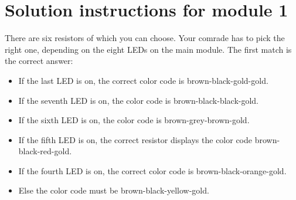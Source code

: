 \documentclass[a4paper, 12pt]{article}
\begin{document}
\section*{Solution instructions for module 1}

There are six resistors of which you can choose. Your comrade has to pick the right one, depending on the eight LEDs on the main module. The first match is the correct answer:
\begin{itemize}
\setlength{\itemsep}{0pt}
\item If the last LED is on, the correct color code is brown-black-gold-gold.
\item If the seventh LED is on, the color code is brown-black-black-gold.
\item If the sixth LED is on, the color code is brown-grey-brown-gold.
\item If the fifth LED is on, the correct resistor displays the color code brown-black-red-gold.
\item If the fourth LED is on, the correct color code is brown-black-orange-gold.
\item Else the color code must be brown-black-yellow-gold.
\end{itemize}
\end{document}
